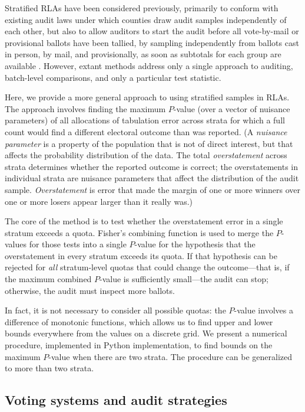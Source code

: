\documentclass[runningheads]{llncs}
\begin{document}
Stratified RLAs have been considered previously, primarily to conform with existing audit laws under which counties draw audit samples independently of each other, but also to allow auditors to start the audit before all vote-by-mail or provisional ballots have been tallied, by sampling independently from ballots cast in person, by mail, and provisionally, as soon as subtotals for each group are available \cite{stark08a,higginsEtal11}.
However, extant methods address only a single approach to auditing, batch-level comparisons, and only a particular test statistic.

Here, we provide a more general approach to using stratified samples in RLAs.
The approach involves finding the maximum $P$-value (over a vector of nuisance parameters) of all allocations of tabulation error across strata for which a full count would find a different electoral outcome than was reported.
(A \emph{nuisance parameter} is a property of the population that is not of direct interest, but that affects the probability distribution of the data. 
The total \emph{overstatement} across strata determines whether the reported outcome is correct; the overstatements in individual strata are nuisance parameters that affect the distribution of the audit sample.
\emph{Overstatement} is error that made the margin of one or more winners over one or more losers appear larger than it really was.)

The core of the method is to test whether the overstatement error in a single stratum exceeds a quota.
Fisher's combining function is used to merge the $P$-values for those tests into a single $P$-value for the hypothesis that the overstatement in every stratum exceeds its quota.
If that hypothesis can be rejected for \emph{all} stratum-level quotas that could change the outcome---that is, if the maximum combined $P$-value is sufficiently small---the audit can stop; otherwise, the audit must inspect more ballots.

In fact, it is not necessary to consider all possible quotas: the $P$-value involves a difference of monotonic functions, which allows us to find upper and lower bounds everywhere from the values on a discrete grid.
We present a numerical procedure, implemented in Python implementation,
to find bounds on the maximum $P$-value when there are two strata.
The procedure can be generalized to more than two strata.


\subsection{Voting systems and audit strategies}
\end{document}
